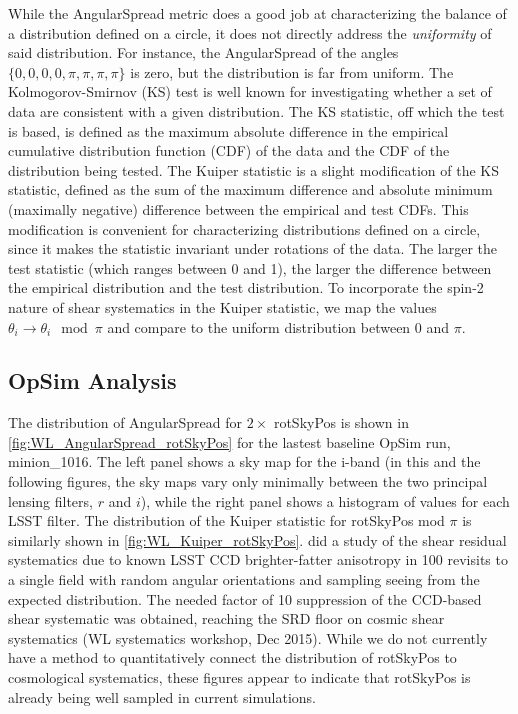 While the AngularSpread metric does a good job at characterizing the balance of
a distribution defined on a circle, it does not directly address the {\emph
{uniformity}} of said distribution.  For instance, the AngularSpread of the
angles $\{0, 0, 0, 0, \pi, \pi, \pi, \pi\}$ is zero, but the distribution is far
from uniform.  The Kolmogorov-Smirnov (KS) test is well known for investigating
whether a set of data are consistent with a given distribution.  The KS
statistic, off which the test is based, is defined as the maximum absolute
difference in the empirical cumulative distribution function (CDF) of the data
and the CDF of the distribution being tested.  The Kuiper statistic is a slight
modification of the KS statistic, defined as the sum of the maximum difference
and absolute minimum (maximally negative) difference between the empirical and
test CDFs.  This modification is convenient for characterizing distributions
defined on a circle, since it makes the statistic invariant under rotations of
the data.  The larger the test statistic (which ranges between 0 and 1), the
larger the difference between the empirical distribution and the test
distribution.  To incorporate the spin-2 nature of shear systematics in the
Kuiper statistic, we map the values $\theta_i \rightarrow \theta_i \mod \pi$ and
compare to the uniform distribution between 0 and $\pi$.


\subsection{OpSim Analysis}

The distribution of AngularSpread for $2 \times$ rotSkyPos is shown in
\autoref{fig:WL_AngularSpread_rotSkyPos} for the lastest baseline OpSim run,
minion\_1016.  The left panel shows a sky map for the i-band (in this and the
following figures, the sky maps vary only minimally between the two principal
lensing filters, $r$ and $i$), while the right panel shows a histogram of values
for each LSST filter.  The distribution of the Kuiper statistic for rotSkyPos
mod $\pi$ is similarly shown in \autoref{fig:WL_Kuiper_rotSkyPos}.
\citet{Jee&Tyson2011} did a study of the shear residual systematics due to known
LSST CCD brighter-fatter anisotropy in 100 revisits to a single field with
random angular orientations and sampling seeing from the expected distribution.
The needed factor of 10 suppression of the CCD-based shear systematic was
obtained, reaching the SRD floor on cosmic shear systematics (WL systematics
workshop, Dec 2015).    While we do not currently have a method to
quantitatively connect the distribution of rotSkyPos to cosmological
systematics, these figures appear to indicate that rotSkyPos is already being
well sampled in current simulations.

